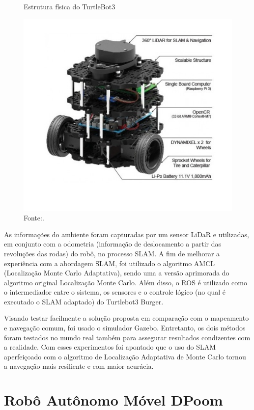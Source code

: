 \begin{figure}[H]
    \centering
    \caption{Estrutura física do TurtleBot3}
    \includegraphics[scale=0.35]{turtlebot3.jpeg}
    \caption*{Fonte:\citet{turtleBot3Burger:2021}.}
    \label{fig:turtlebotSLAM}
\end{figure}

As informações do ambiente foram capturadas por um sensor LiDaR e utilizadas, em conjunto com a odometria  (informação de deslocamento a partir das revoluções das rodas) do robô, no processo SLAM. A fim de melhorar a experiência com a abordagem SLAM, foi utilizado o algoritmo AMCL (Localização Monte Carlo Adaptativa), sendo uma a versão aprimorada do algoritmo original Localização Monte Carlo. Além disso, o ROS é utilizado como o intermediador entre o sistema, os sensores e o controle lógico (no qual é executado o SLAM adaptado) do Turtlebot3 Burger. 

Visando testar facilmente a solução proposta em comparação com o mapeamento e navegação comum, foi usado o simulador Gazebo. Entretanto, os dois métodos foram testados no mundo real também para assegurar resultados condizentes com a realidade. Com esses experimentos foi apontado que o uso do SLAM aperfeiçoado com o algoritmo de Localização Adaptativa de Monte Carlo tornou a navegação mais resiliente e com maior acurácia.


\section{Robô Autônomo Móvel DPoom}

